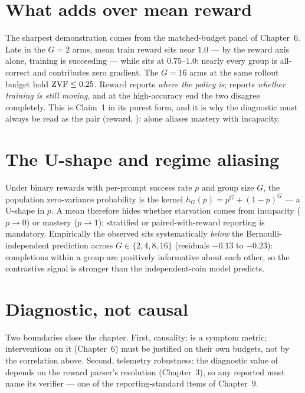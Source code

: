 \section{What \ZVF{} adds over mean reward}
The sharpest demonstration comes from the matched-budget panel of Chapter~6.
Late in the $G{=}2$ arms, mean train reward sits near $1.0$ --- by the reward
axis alone, training is succeeding --- while \ZVF{} sits at $0.75$--$1.0$:
nearly every group is all-correct and contributes zero gradient. The $G{=}16$
arms at the same rollout budget hold $\mathrm{ZVF}\le0.25$. Reward reports \emph{where
the policy is}; \ZVF{} reports \emph{whether training is still moving}, and at
the high-accuracy end the two disagree completely. This is Claim~1 in its
purest form, and it is why the diagnostic must always be read as the pair
(reward, \ZVF{}): \ZVF{} alone aliases mastery with incapacity.

\section{The U-shape and regime aliasing}
Under binary rewards with per-prompt success rate $p$ and group size $G$, the
population zero-variance probability is the kernel $h_G(p)=p^G+(1-p)^G$ ---
a U-shape in $p$. A mean \ZVF{} therefore hides whether starvation comes from
incapacity ($p\to0$) or mastery ($p\to1$); stratified or paired-with-reward
reporting is mandatory. Empirically the observed \ZVF{} sits systematically
\emph{below} the Bernoulli-independent prediction across $G\in\{2,4,8,16\}$
(residuals $-0.13$ to $-0.23$): completions within a group are positively
informative about each other, so the contrastive signal is stronger than the
independent-coin model predicts.

\section{Diagnostic, not causal}
Two boundaries close the chapter. First, causality: \ZVF{} is a symptom
metric; interventions on it (Chapter~6) must be justified on their own
budgets, not by the correlation above. Second, telemetry robustness: the
diagnostic value of \ZVF{} depends on the reward parser's resolution
(Chapter~3), so any reported \ZVF{} must name its verifier --- one of the
reporting-standard items of Chapter~9.
